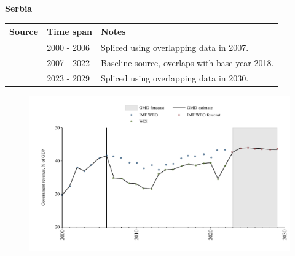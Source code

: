 \documentclass[12pt,a4paper,landscape]{article}
\begin{document}
\begin{adjustbox}{max totalsize={\paperwidth}{\paperheight},center}
\begin{minipage}[t][\textheight][t]{\textwidth}
\vspace*{0.5cm}
{}
\begin{center}
{\Large\bfseries Serbia}
\end{center}
\vspace{0.5cm}
\begin{table}[H]
\centering
\small
\begin{tabular}{|l|l|l|}
\hline
\textbf{Source} & \textbf{Time span} & \textbf{Notes} \\
\hline
\rowcolor{white}\cite{IMF_WEO}& 2000 - 2006 &Spliced using overlapping data in 2007.\\
\rowcolor{lightgray}\cite{WDI}& 2007 - 2022 &Baseline source, overlaps with base year 2018.\\
\rowcolor{white}\cite{IMF_WEO_forecast}& 2023 - 2029 &Spliced using overlapping data in 2030.\\
\hline
\end{tabular}
\end{table}
\begin{figure}[H]
\centering
\includegraphics[width=\textwidth,height=0.6\textheight,keepaspectratio]{graphs/SRB_govrev_GDP.pdf}
\end{figure}
\end{minipage}
\end{adjustbox}
\end{document}
